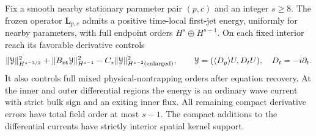 \begin{proposition}\label{co2:stationary-energy}
Fix a smooth nearby stationary parameter pair $(p,c)$ and an integer $s\ge8$.
The frozen operator $\mathbf L_{p,c}$ admits a positive time-local first-jet
energy, uniformly for nearby parameters, with full endpoint orders
$H^s\oplus H^{s-1}$.  On each fixed interior reach its favorable derivative
controls
\begin{equation}\label{co2:frozen-dissipation}
 \|\mathcal Y\|_{H^{s-3/2}}^2
       +\|B_{\rm nt}\mathcal Y\|_{H^{s-1}}^2
       -C_s\|\mathcal Y\|_{H^{s-2}({\rm enlarged})}^2,
 \qquad \mathcal Y=(\langle D_y\rangle U,D_tU),
 \quad D_t=-i\partial_t.
\end{equation}
It also controls full mixed physical-nontrapping orders after equation
recovery.  At the inner and outer differential regions the energy is an
ordinary wave current with strict bulk sign and an exiting inner flux.  All
remaining compact derivative errors have total field order at most $s-1$.
The compact additions to the differential currents have strictly interior
spatial kernel support.
\end{proposition}

